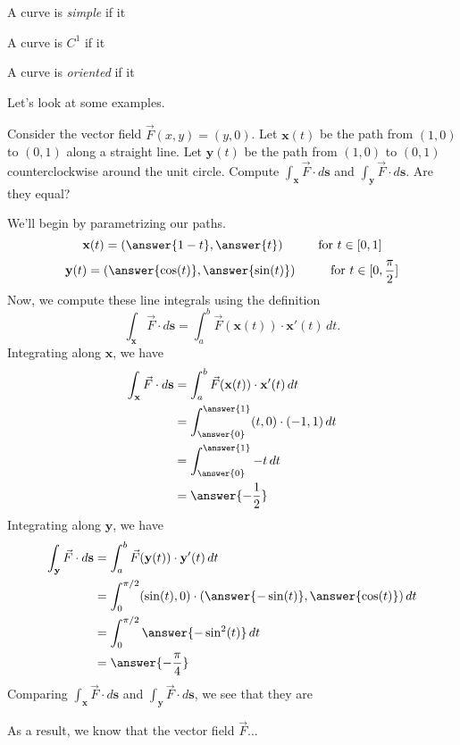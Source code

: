 \documentclass{ximera}
\begin{document}
A curve is \emph{simple} if it 

A curve is $C^1$ if it 

A curve is \emph{oriented} if it 

Let's look at some examples.

\begin{example}
Consider the vector field $\vec{F}(x,y) = (y,0)$. Let $\textbf{x}(t)$ be the path from $(1,0)$ to $(0,1)$ along a straight line. Let $\textbf{y}(t)$ be the path from $(1,0)$ to $(0,1)$ counterclockwise around the unit circle. Compute $\int_\textbf{x} \vec{F}\cdot d\textbf{s}$ and $\int_\textbf{y} \vec{F}\cdot d\textbf{s}$. Are they equal?

We'll begin by parametrizing our paths.
\[
\textbf{x}(t)= (\answer{1-t},\answer{t})\hspace{1cm}\textrm{for }t\in[0,1]
\]
\[
\textbf{y}(t)= (\answer{\cos(t)},\answer{\sin(t)})\hspace{1cm}\textrm{for }t\in[0,\frac{\pi}{2}]
\]
Now, we compute these line integrals using the definition
\[
\int_\textbf{x} \vec{F}\cdot d\textbf{s} = \int_a^b\vec{F}(\textbf{x}(t))\cdot \textbf{x}'(t)\,dt.
\]
Integrating along $\textbf{x}$, we have
\begin{align*}
\int_\textbf{x} \vec{F}\cdot d\textbf{s} &= \int_a^b\vec{F}(\textbf{x}(t))\cdot \textbf{x}'(t)\,dt\\
&= \int_{\answer{0}}^{\answer{1}}(t,0)\cdot(-1, 1)\,dt\\
&= \int_{\answer{0}}^{\answer{1}}-t\,dt\\
&= \answer{-\frac{1}{2}}
\end{align*}
Integrating along $\textbf{y}$, we have
\begin{align*}
\int_\textbf{y} \vec{F}\cdot d\textbf{s} &= \int_a^b\vec{F}(\textbf{y}(t))\cdot \textbf{y}'(t)\,dt\\
&= \int_{0}^{\pi/2}(\sin(t),0)\cdot({\answer{-\sin(t)}}, {\answer{\cos(t)}})\,dt\\
&= \int_{0}^{\pi/2}\answer{-\sin^2(t)}\,dt\\
&= \answer{-\frac{\pi}{4}}
\end{align*}
Comparing $\int_\textbf{x} \vec{F}\cdot d\textbf{s}$ and $\int_\textbf{y} \vec{F}\cdot d\textbf{s}$, we see that they are
\begin{multipleChoice}
\end{multipleChoice}

As a result, we know that the vector field $\vec{F}$...
\begin{multipleChoice}
\end{multipleChoice}

\end{example}
\end{document}
